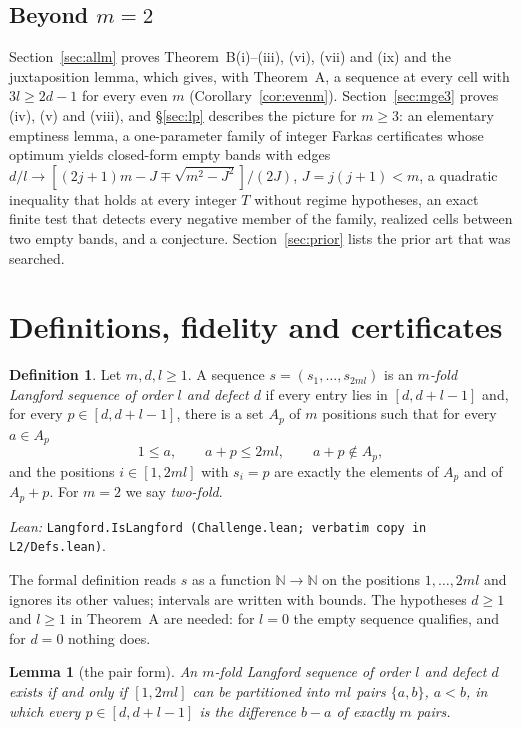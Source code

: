 \documentclass[11pt]{amsart}
\theoremstyle{plain}
\newtheorem{lemma}[theorem]{Lemma}
\theoremstyle{definition}
\newtheorem{definition}[theorem]{Definition}
\theoremstyle{remark}
\newcommand{\lean}[1]{\par\smallskip
  {\small\raggedright\noindent\textit{Lean:} \texttt{#1}.\par}\smallskip}
\begin{document}
\subsection*{Beyond \texorpdfstring{$m = 2$}{m = 2}}
Section~\ref{sec:allm} proves Theorem~B(i)--(iii), (vi), (vii) and (ix) and the
juxtaposition lemma, which gives, with Theorem~A, a sequence at every cell with
$3l \ge 2d-1$ for every even $m$ (Corollary~\ref{cor:evenm}). Section~\ref{sec:mge3}
proves (iv), (v) and (viii), and \S\ref{sec:lp} describes the picture for $m \ge 3$: an
elementary emptiness lemma, a one-parameter family of integer Farkas certificates whose
optimum yields closed-form empty bands with edges
$d/l \to [(2j+1)m - J \mp \sqrt{m^2-J^2}]/(2J)$, $J = j(j+1) < m$, a quadratic
inequality that holds at every integer $T$ without regime hypotheses, an exact finite
test that detects every negative member of the family, realized cells between two empty
bands, and a conjecture. Section~\ref{sec:prior} lists the prior art that was searched.

\section{Definitions, fidelity and certificates}\label{sec:defs}

\begin{definition}\label{def:seq}
Let $m, d, l \ge 1$. A sequence $s = (s_1,\dots,s_{2ml})$ is an \emph{$m$-fold Langford
sequence of order $l$ and defect $d$} if every entry lies in $[d,d+l-1]$ and, for every
$p \in [d,d+l-1]$, there is a set $A_p$ of $m$ positions such that for every $a \in A_p$
\[
  1 \le a, \qquad a + p \le 2ml, \qquad a + p \notin A_p,
\]
and the positions $i \in [1,2ml]$ with $s_i = p$ are exactly the elements of $A_p$ and
of $A_p + p$. For $m = 2$ we say \emph{two-fold}.
\end{definition}
\lean{Langford.IsLangford (Challenge.lean; verbatim copy in L2/Defs.lean)}

The formal definition reads $s$ as a function $\mathbb{N} \to \mathbb{N}$ on the positions
$1,\dots,2ml$ and ignores its other values; intervals are written with bounds. The
hypotheses $d \ge 1$ and $l \ge 1$ in Theorem~A are needed: for $l = 0$ the empty
sequence qualifies, and for $d = 0$ nothing does.

\begin{lemma}[the pair form]\label{lem:pairform}
An $m$-fold Langford sequence of order $l$ and defect $d$ exists if and only if $[1,2ml]$
can be partitioned into $ml$ pairs $\{a,b\}$, $a<b$, in which every $p \in [d,d+l-1]$ is
the difference $b-a$ of exactly $m$ pairs.
\end{lemma}
\end{document}
